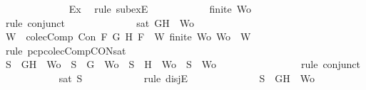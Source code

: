 \begin{isabellebody}
\ \ \ \ \ \ \ \ \ \ \ \ \isamarkupfalse%
\ Ex\ \isamarkupfalse%
\ {\isacharparenleft}rule\ subexE{\isacharparenright}\isanewline
\ \ \ \ \ \ \ \ \ \ \isamarkupfalse%
\ {\isachardoublequoteopen}finite\ Wo{\isacharprime}{\isachardoublequoteclose}\isanewline
\ \ \ \ \ \ \ \ \ \ \ \ \isamarkupfalse%
\ {}\ \isamarkupfalse%
\ {\isacharparenleft}rule\ conjunct{}{\isacharparenright}\isanewline
\ \ \ \ \ \ \ \ \ \ \ \ \isamarkupfalse%
\ {\isachardoublequoteopen}sat\ {\isacharparenleft}{\isacharbraceleft}G{\isacharcomma}H{\isacharbraceright}\ {\isasymunion}\ Wo{\isacharprime}{\isacharparenright}{\isachardoublequoteclose}\ \isanewline
\ \ \ \ \ \ \ \ \ \ \ \ \ \ \isamarkupfalse%
\ {\isacartoucheopen}W\ {\isasymin}\ colecComp{\isacartoucheclose}\ {\isacartoucheopen}Con\ F\ G\ H{\isacartoucheclose}\ {\isacartoucheopen}F\ {\isasymin}\ W{\isacartoucheclose}\ {\isacartoucheopen}finite\ Wo{\isacharprime}{\isacartoucheclose}\ {\isacartoucheopen}Wo{\isacharprime}\ {\isasymsubseteq}\ W{\isacartoucheclose}\ \isamarkupfalse%
\ {\isacharparenleft}rule\ pcp{\isacharunderscore}colecComp{\isacharunderscore}CON{\isacharunderscore}sat{\isacharparenright}\isanewline
\ \ \ \ \ \ \ \ \ \ \isamarkupfalse%
\ {\isachardoublequoteopen}S{\isacharprime}\ {\isacharequal}\ {\isacharbraceleft}G{\isacharcomma}H{\isacharbraceright}\ {\isasymunion}\ Wo{\isacharprime}\ {\isasymor}\ S{\isacharprime}\ {\isacharequal}\ {\isacharbraceleft}G{\isacharbraceright}\ {\isasymunion}\ Wo{\isacharprime}\ {\isasymor}\ S{\isacharprime}\ {\isacharequal}\ {\isacharbraceleft}H{\isacharbraceright}\ {\isasymunion}\ Wo{\isacharprime}\ {\isasymor}\ S{\isacharprime}\ {\isacharequal}\ Wo{\isacharprime}{\isachardoublequoteclose}\isanewline
\ \ \ \ \ \ \ \ \ \ \ \ \isamarkupfalse%
\ {}\ \isamarkupfalse%
\ {\isacharparenleft}rule\ conjunct{}{\isacharparenright}\isanewline
\ \ \ \ \ \ \ \ \ \ \isamarkupfalse%
\ {\isachardoublequoteopen}sat\ S{\isacharprime}{\isachardoublequoteclose}\isanewline
\ \ \ \ \ \ \ \ \ \ \isamarkupfalse%
\ {\isacharparenleft}rule\ disjE{\isacharparenright}\isanewline
\ \ \ \ \ \ \ \ \ \ \ \ \isamarkupfalse%
\ {\isachardoublequoteopen}S{\isacharprime}\ {\isacharequal}\ {\isacharbraceleft}G{\isacharcomma}H{\isacharbraceright}\ {\isasymunion}\ Wo{\isacharprime}{\isachardoublequoteclose}\isanewline
\ \ \ \ \ \ \ \ \ \ \ \ \isamarkupfalse%

\end{isabellebody}
